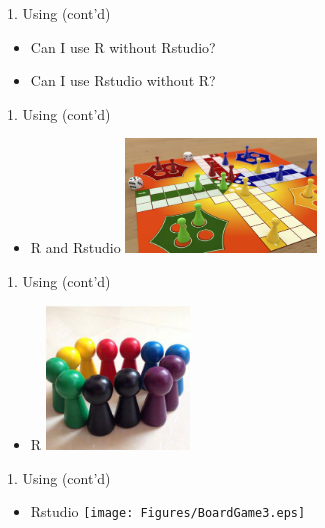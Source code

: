 \documentclass[14pt, aspectratio=169, sectionpage=simple, xclolor=table]{beamer}
\begin{document}
\begin{frame}{1. Using \R (cont'd)}
\begin{itemize}
\item Can I use R without Rstudio?
\item Can I use Rstudio without R?
\end{itemize}
\end{frame}
\begin{frame}{1. Using \R (cont'd)}
\begin{itemize}
\item R and Rstudio 
\newline\newline
\includegraphics[width=0.4\textwidth, height=0.4\textheight]{Figures/BoardGame2.eps}   
\end{itemize}
\end{frame}
\begin{frame}{1. Using \R (cont'd)}
\begin{itemize}
\item R 
\newline\newline
\includegraphics[width=0.3\textwidth, height=0.4\textheight]{Figures/BoardGame1.eps}   
\end{itemize}
\end{frame}
\begin{frame}{1. Using \R (cont'd)}
\begin{itemize}
\item Rstudio 
\newline\newline
\texttt{[image: Figures/BoardGame3.eps]}   
\end{itemize}
\end{frame}
\end{document}
